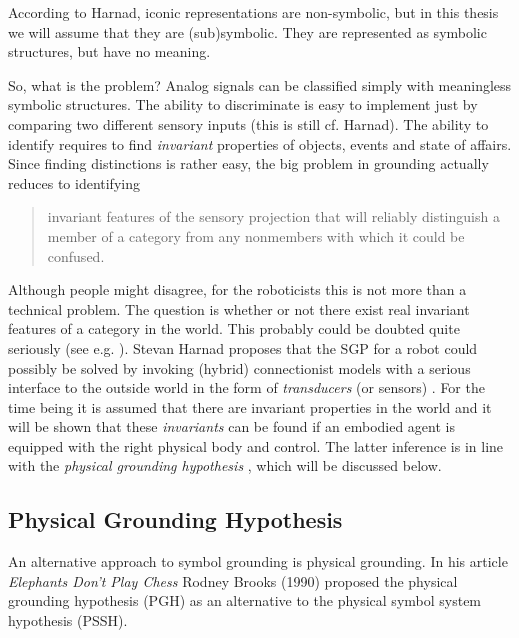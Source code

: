 \n
According to Harnad, iconic representations are non-symbolic, but in this thesis we will assume that they are (sub)symbolic. They are represented as symbolic structures, but have no meaning.

So, what is the problem? Analog signals can be classified simply with meaningless symbolic structures. The ability to discriminate is easy to implement just by comparing two different sensory inputs (this is still cf. Harnad). The ability to identify requires to find {\em invariant} properties of objects, events and state of affairs. Since finding distinctions is rather easy, the big problem in grounding actually reduces to identifying

\begin{quote}
invariant features of the sensory projection that will reliably distinguish a member of  a category from any nonmembers with which it could be confused. \cite{harnad:1990}
\end{quote}

Although people might disagree, for the roboticists this is not more than a technical problem. The question is whether or not there exist real invariant features of a category in the world. This probably could be doubted quite seriously (see e.g. \cite{harnad:1993}). Stevan Harnad proposes that the SGP for a robot could possibly be solved by invoking (hybrid) connectionist models with a serious interface to the outside world in the form of {\em transducers} (or sensors) \cite{harnad:1993}. For the time being it is assumed that there are invariant properties in the world and it will be shown that these {\em invariants} can be found if an embodied agent is equipped with the right physical body and control. The latter inference is in line with the {\em physical grounding hypothesis} \cite{brooks:1990}, which will be discussed below.

\subsection{Physical Grounding Hypothesis}\label{s:theory:pgh}

An alternative approach to symbol grounding is physical grounding. In his article {\em Elephants Don't Play Chess} Rodney Brooks (1990) proposed the physical grounding hypothesis (PGH) as an alternative to the physical symbol system hypothesis (PSSH). 


